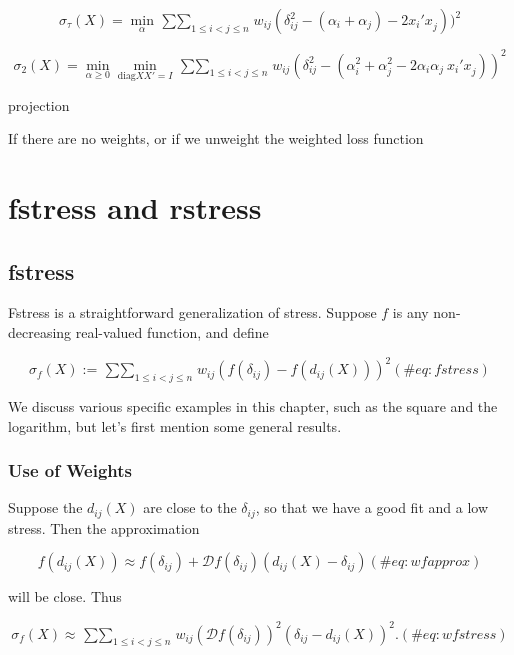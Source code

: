 \documentclass[
  12pt,
  letterpaper,
  DIV=11,
  numbers=noendperiod]{scrreprt}
\theoremstyle{remark}
\begin{document}
\[
\sigma_\tau(X)=\min_{\alpha}\mathop{\sum\sum}_{1\leq i<j\leq n}w_{ij}(\delta_{ij}^2-(\alpha_i+\alpha_j)-2x_i'x_j^{\ }))^2
\]

\[
\sigma_2(X)=\min_{\alpha\geq 0}\min_{\text{diag}XX'=I}\mathop{\sum\sum}_{1\leq i<j\leq n}w_{ij}(\delta_{ij}^2-(\alpha_i^2+\alpha_j^2-2\alpha_i\alpha_j\ x_i'x_j^{\ }))^2
\]

projection

If there are no weights, or if we unweight the weighted loss function


\chapter{fstress and rstress}\label{chrstress}

\section{fstress}\label{fstress}

Fstress is a straightforward generalization of stress. Suppose \(f\) is
any non-decreasing real-valued function, and define

\begin{equation}
\sigma_f(X):=\mathop{\sum\sum}_{1\leq i<j\leq n}w_{ij}(f(\delta_{ij})-f(d_{ij}(X)))^2
(\#eq:fstress)
\end{equation}

We discuss various specific examples in this chapter, such as the square
and the logarithm, but let's first mention some general results.

\subsection{Use of Weights}\label{use-of-weights}

Suppose the \(d_{ij}(X)\) are close to the \(\delta_{ij}\), so that we
have a good fit and a low stress. Then the approximation

\begin{equation}
f(d_{ij}(X))\approx f(\delta_{ij})+\mathcal{D}f(\delta_{ij})(d_{ij}(X)-\delta_{ij})
(\#eq:wfapprox)
\end{equation}

will be close. Thus

\begin{equation}
\sigma_f(X)\approx\mathop{\sum\sum}_{1\leq i<j\leq n}w_{ij}(\mathcal{D}f(\delta_{ij}))^2(\delta_{ij}-d_{ij}(X))^2.
(\#eq:wfstress)
\end{equation}
\end{document}
